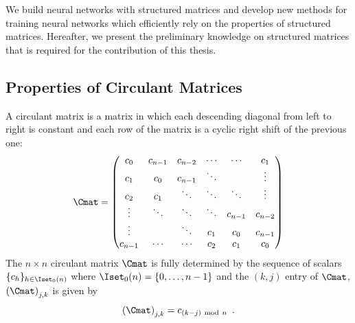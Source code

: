 


We build neural networks with structured matrices and develop new methods for training neural networks which efficiently rely on the properties of structured matrices. 
Hereafter, we present the preliminary knowledge on structured matrices that is required for the contribution of this thesis. 


\subsection{Properties of Circulant Matrices}
\label{subsection:ch2-properties_of_circulant_matrices}

A circulant matrix is a matrix in which each descending diagonal from left to right is constant and each row of the matrix is a cyclic right shift of the previous one:
\begin{equation}
  \Cmat =
  \leftmatrix
    c_0 & c_{n-1} & c_{n-2} & \cdots & \cdots & c_{1} \\
    c_{1} & c_0 & c_{n-1} & \ddots & & \vdots \\
    c_{2} & c_{1} & \ddots & \ddots & \ddots & \vdots \\
    \vdots & \ddots & \ddots & \ddots & c_{n-1} & c_{n-2} \\
    \vdots & & \ddots & c_{1} & c_{0} & c_{n-1} \\
    c_{n-1} & \cdots & \cdots & c_{2} & c_{1} & c_0
  \rightmatrix
\end{equation}
\noindent
The $n \times n$ circulant matrix $\Cmat$ is fully determined by the sequence of scalars $\{c_h\}_{h \in \Iset_0(n)}$ where $\Iset_0(n)= \{0, \ldots, n-1\}$ and the $(k,j)$ entry of $\Cmat$, $\leftmat \Cmat \rightmat_{j,k}$ is given by
\begin{equation}
  \leftmat \Cmat \rightmat_{j,k} = c_{\left(k-j\right) \mod n} \enspace.
\end{equation}



